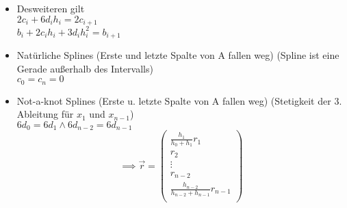 \begin{itemize}
	\item Desweiteren gilt \\
		$2 c_i + 6 d_i h_i = 2 c_{i+1}$ \\
		$b_i + 2 c_i h_i + 3 d_i h_i^2 = b_{i+1}$
	
	\item Natürliche Splines (Erste und letzte Spalte von A fallen weg)
	(Spline ist eine Gerade außerhalb des Intervalls) \\
	$c_0 = c_n = 0$
	
	\item Not-a-knot Splines (Erste u. letzte Spalte von A fallen weg)
	(Stetigkeit der 3. Ableitung für $x_1$ und $x_{n-1}$) \\
	$6d_0 = 6d_1 \wedge 6d_{n-2} = 6d_{n-1}$ 
	\begin{displaymath}
		\implies \vec{r} =
		\begin{pmatrix}
			\frac{h_1}{h_0 + h_1} r_1 \\
			r_2 \\
			\vdots \\
			r_{n-2} \\
			\frac{h_{n-2}}{h_{n-2}+h_{n-1}} r_{n-1} \\
		\end{pmatrix}
	\end{displaymath}
	
\end{itemize}
